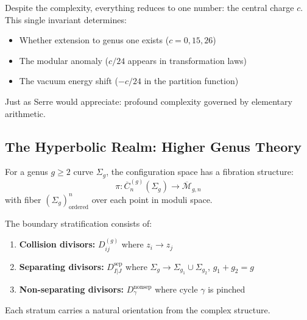 \begin{remark}
Despite the complexity, everything reduces to one number: the central charge $c$. This single invariant determines:
\begin{itemize}
\item Whether extension to genus one exists ($c = 0, 15, 26$)
\item The modular anomaly ($c/24$ appears in transformation laws)
\item The vacuum energy shift ($-c/24$ in the partition function)
\end{itemize}
Just as Serre would appreciate: profound complexity governed by elementary arithmetic.
\end{remark}


\subsection{The Hyperbolic Realm: Higher Genus Theory}\label{subsec:higher-genus}

\begin{definition}
For a genus $g \geq 2$ curve $\Sigma_g$, the configuration space has a fibration structure:
$$\pi: \overline{C}_n^{(g)}(\Sigma_g) \to \overline{\mathcal{M}}_{g,n}$$
with fiber $(\Sigma_g)^n_{\text{ordered}}$ over each point in moduli space.

The boundary stratification consists of:
\begin{enumerate}
\item \textbf{Collision divisors:} $D_{ij}^{(g)}$ where $z_i \to z_j$
\item \textbf{Separating divisors:} $D_{I|J}^{\text{sep}}$ where $\Sigma_g \to \Sigma_{g_1} \cup \Sigma_{g_2}$, $g_1 + g_2 = g$
\item \textbf{Non-separating divisors:} $D_\gamma^{\text{nonsep}}$ where cycle $\gamma$ is pinched
\end{enumerate}

Each stratum carries a natural orientation from the complex structure.
\end{definition}

